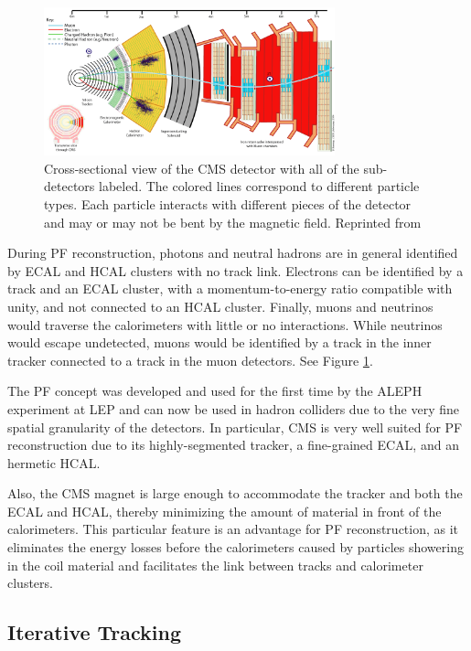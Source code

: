  \begin{figure}[h]
  	\label{fig:cmsslice}
 	\centering
 	\includegraphics[width=0.75\textwidth]{figures/image005.png}
 	\singlespace
 	\caption{Cross-sectional view of the CMS detector with all of the sub-detectors labeled. The colored lines correspond to different particle types. Each particle interacts with different pieces of the detector and may or may not be bent by the magnetic field. Reprinted from \cite{CMSSlice}}
 \end{figure}

During PF reconstruction, photons and neutral hadrons are in general identified by ECAL and HCAL clusters with no track link. Electrons can be identified by a track and an ECAL cluster, with a momentum-to-energy ratio compatible with unity, and not connected to an HCAL cluster. Finally, muons and neutrinos would traverse the calorimeters with little or no interactions. While neutrinos would escape undetected, muons would be identified by a track in the inner tracker connected to a track in the muon detectors. See Figure \ref{fig:cmsslice}.

The PF concept was developed and used for the first time by the ALEPH experiment at LEP\cite{BUSKULIC1995481} and can now be used in hadron colliders due to the very fine spatial granularity of the detectors. In particular, CMS is very well suited for PF reconstruction due to its highly-segmented tracker,  a fine-grained ECAL, and an hermetic HCAL.

Also, the CMS magnet is large enough to accommodate the tracker and both the ECAL and HCAL, thereby minimizing the amount of material in front of the calorimeters. This particular feature is an advantage for PF reconstruction, as it eliminates the energy losses before the calorimeters caused by particles showering in the coil material and facilitates the link between tracks and calorimeter clusters.

\subsection{Iterative Tracking}

